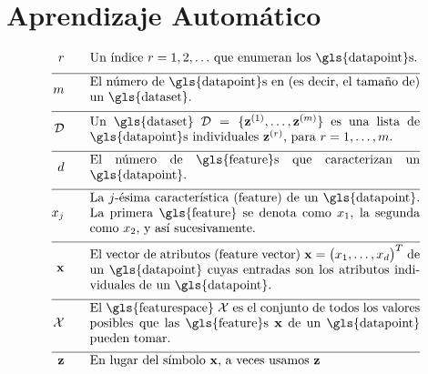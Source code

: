 \newpage
\section*{Aprendizaje Automático}

\begin{align}
	\sampleidx \quad\quad & \parbox{.75\textwidth}{Un índice $\sampleidx=1,2,\ldots$ que 
		enumeran los \gls{datapoint}s.}   \nonumber \\[2mm] \hline \nonumber\\[-5mm]
	\samplesize \quad\quad &\parbox{.75\textwidth}{El número de \gls{datapoint}s en (es decir, el tamaño de) un \gls{dataset}.} \nonumber \\[2mm] \hline \nonumber\\[-5mm] 
	\dataset \quad\quad & \parbox{.75\textwidth}{Un \gls{dataset} $\dataset = \{ \datapoint^{(1)},\ldots, \datapoint^{(\samplesize)} \}$ 
		es una lista de \gls{datapoint}s individuales $\datapoint^{(\sampleidx)}$, para $\sampleidx=1,\ldots,\samplesize$.}   \nonumber \\[2mm] \hline \nonumber\\[-5mm]
	\featurelen \quad\quad &\parbox{.75\textwidth}{El número de \gls{feature}s que caracterizan un \gls{datapoint}.}\nonumber \\[2mm] \hline \nonumber\\[-5mm]
	\feature_{\featureidx} \quad\quad &\parbox{.75\textwidth}{La $\featureidx$-ésima característica (feature) de un \gls{datapoint}. La primera \gls{feature} 
		se denota como $\feature_{1}$, la segunda como $\feature_{2}$, y así sucesivamente. } \nonumber \\[2mm] \hline \nonumber\\[-5mm] 
	\featurevec \quad\quad &\parbox{.75\textwidth}{El vector de atributos (feature vector) $\featurevec=\big(\feature_{1},\ldots,\feature_{\featuredim}\big)^{T}$ de un \gls{datapoint} 
		cuyas entradas son los atributos individuales de un \gls{datapoint}.}\nonumber \\[2mm] \hline \nonumber\\[-5mm]
	\featurespace \quad\quad & \parbox{.75\textwidth}{El \gls{featurespace} $\featurespace$ es 
		el conjunto de todos los valores posibles que las \gls{feature}s $\featurevec$ de un \gls{datapoint} pueden tomar.} \nonumber \\[2mm] \hline \nonumber\\[-5mm]
	\rawfeaturevec \quad\quad &\parbox{.75\textwidth}{En lugar del símbolo $\featurevec$, a veces usamos $\rawfeaturevec$ 
}
\end{align}
